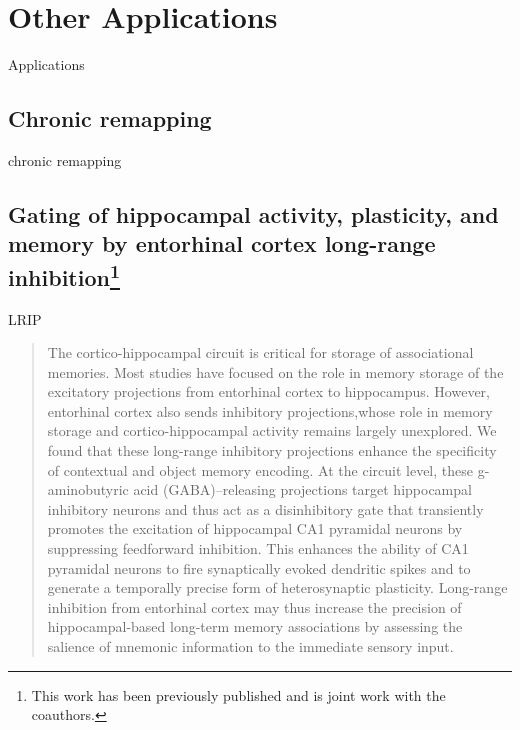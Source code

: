 \acresetall
\chapter{Other Applications}
Applications

\section{Chronic remapping}\label{sec:applications:chronic}
chronic remapping

\section[Gating of hippocampal activity, plasticity, and memory by entorhinal cortex long-range inhibition]{Gating of hippocampal activity, plasticity, and memory by entorhinal cortex long-range inhibition\footnote{This work has been previously published \citep{Basu2016} and is joint work with the coauthors.}}
LRIP
\begin{quote}
The cortico-hippocampal circuit is critical for storage of associational memories. Most studies have focused on the role in memory storage of the excitatory projections from entorhinal cortex to hippocampus. However, entorhinal cortex also sends inhibitory projections,whose role in memory storage and cortico-hippocampal activity remains largely unexplored. We found that these long-range inhibitory projections enhance the specificity of contextual and object memory encoding. At the circuit level, these g-aminobutyric acid (GABA)–releasing projections target hippocampal inhibitory neurons and thus act as a disinhibitory gate that transiently promotes the excitation of hippocampal CA1 pyramidal neurons by suppressing feedforward inhibition. This enhances the ability of CA1 pyramidal neurons to fire synaptically evoked dendritic spikes and to generate a temporally precise form of heterosynaptic plasticity. Long-range inhibition from entorhinal cortex may thus increase the precision of hippocampal-based long-term memory associations by assessing the salience of mnemonic information to the immediate sensory input.
\end{quote}

